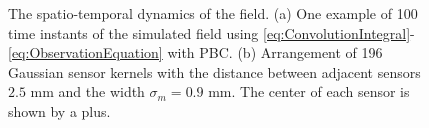 \documentclass[10pt,twocolumn,twoside]{IEEEtran}
\begin{document}
\begin{figure}[!h]
	\centering
	\caption{The spatio-temporal dynamics of the field.
(a) One example of 100 time instants of the simulated field using \eqref{eq:ConvolutionIntegral}-\eqref{eq:ObservationEquation} with PBC.
(b) Arrangement of 196 Gaussian sensor kernels with the distance between adjacent sensors $2.5$ mm and the width $\sigma_m=0.9$ mm.
The center of each sensor is shown by a plus.}
\label{fig:SimulatedData}
\end{figure}   
\end{document}

